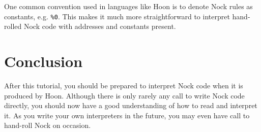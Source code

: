 \documentclass[twoside]{article}
\begin{document}
One common convention used in languages like Hoon is to denote Nock rules as constants, e.g. \@\lstinline[style=inlinecode]{%0}.  This makes it much more straightforward to interpret hand-rolled Nock code with addresses and constants present.

\section{Conclusion}

After this tutorial, you should be prepared to interpret Nock code when it is produced by Hoon.  Although there is only rarely any call to write Nock code directly, you should now have a good understanding of how to read and interpret it.  As you write your own interpreters in the future, you may even have call to hand-roll Nock on occasion.

\end{document}
